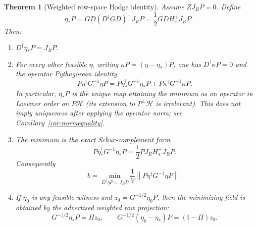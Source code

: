 \documentclass[11pt]{article}
\newtheorem{theorem}{Theorem}[section]
\theoremstyle{definition}
\theoremstyle{remark}
\newcommand{\Id}{\mathbb I}
\newcommand{\cH}{\mathcal H}
\newcommand{\norm}[1]{\left\lVert #1\right\rVert}
\begin{document}
\begin{theorem}[Weighted row-space Hodge identity]
\label{thm:hodge}
Assume $ZJ_RP=0$.  Define
\begin{equation}
 \boxed{
 \eta_*P
 =GD(D^\dagger GD)^+J_RP
 =\frac12GDH_s^+J_RP.}
 \label{eq:etastar}
\end{equation}
Then:
\begin{enumerate}[label=\textup{(\roman*)}]
\item $D^\dagger\eta_*P=J_RP$.
\item For every other feasible $\eta$, writing $\kappa P=(\eta-\eta_*)P$, one has $D^\dagger\kappa P=0$ and the operator Pythagorean identity
\begin{equation}
 \boxed{
 P\eta^\dagger G^{-1}\eta P
 =P\eta_*^\dagger G^{-1}\eta_*P
 +P\kappa^\dagger G^{-1}\kappa P.}
 \label{eq:pythagorean}
\end{equation}
In particular, $\eta_*P$ is the unique map attaining the minimum \emph{as an operator in Loewner order} on $P\cH$ (its extension to $P^\perp\cH$ is irrelevant).  This does not imply uniqueness after applying the operator norm; see Corollary~\ref{cor:normequality}.
\item The minimum is the exact Schur-complement form
\begin{equation}
 \boxed{
 P\eta_*^\dagger G^{-1}\eta_*P
 =\frac12PJ_RH_s^+J_RP.}
 \label{eq:exactcost}
\end{equation}
Consequently
\begin{equation}
 \boxed{
 b
 =\min_{D^\dagger\eta P=J_RP}
 \frac1V\norm{P\eta^\dagger G^{-1}\eta P}.}
 \label{eq:bmin}
\end{equation}
\item If $\eta_0$ is any feasible witness and $z_0=G^{-1/2}\eta_0P$, then the minimizing field is obtained by the advertised weighted row projection:
\begin{equation}
 G^{-1/2}\eta_*P=\Pi z_0,
 \qquad
 G^{-1/2}(\eta_0-\eta_*)P=(\Id-\Pi)z_0.
 \label{eq:projectionformula}
\end{equation}
\end{enumerate}
\end{theorem}
\end{document}
